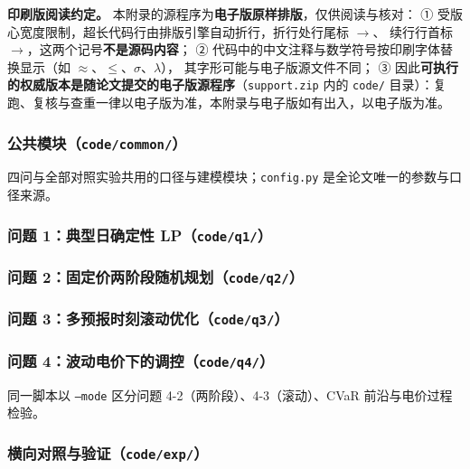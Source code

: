 \textbf{印刷版阅读约定。} 本附录的源程序为\textbf{电子版原样排版}，仅供阅读与核对：
① 受版心宽度限制，超长代码行由排版引擎自动折行，折行处行尾标 $\rightarrow$、
续行行首标 $\rightarrow$，这两个记号\textbf{不是源码内容}；
② 代码中的中文注释与数学符号按印刷字体替换显示（如 $\approx$、$\leq$、$\sigma$、$\lambda$），
其字形可能与电子版源文件不同；
③ 因此\textbf{可执行的权威版本是随论文提交的电子版源程序}（\texttt{support.zip} 内的
\texttt{code/} 目录）：复跑、复核与查重一律以电子版为准，本附录与电子版如有出入，以电子版为准。

\subsubsection{公共模块（\texttt{code/common/}）}

四问与全部对照实验共用的口径与建模模块；\texttt{config.py} 是全论文唯一的参数与口径来源。


\subsubsection{问题 1：典型日确定性 LP（\texttt{code/q1/}）}


\subsubsection{问题 2：固定价两阶段随机规划（\texttt{code/q2/}）}


\subsubsection{问题 3：多预报时刻滚动优化（\texttt{code/q3/}）}


\subsubsection{问题 4：波动电价下的调控（\texttt{code/q4/}）}

同一脚本以 \texttt{--mode} 区分问题 4-2（两阶段）、4-3（滚动）、CVaR 前沿与电价过程检验。


\subsubsection{横向对照与验证（\texttt{code/exp/}）}


